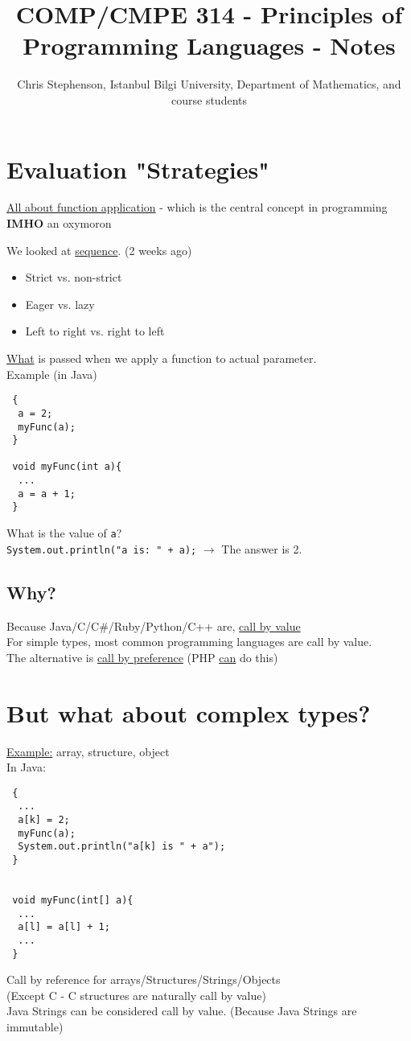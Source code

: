 \documentclass{article}
\begin{document}
\title{COMP/CMPE 314 - Principles of Programming Languages - Notes}
\author{Chris Stephenson, Istanbul Bilgi University, Department of Mathematics, and course students}
\maketitle

\section*{Evaluation "Strategies"}
\underline{All about function application} - which is the central concept in programming \textbf{IMHO} an oxymoron
\begin{flushleft}
 We looked at \underline{sequence}. (2 weeks ago)
 \begin{itemize}
  \item Strict vs. non-strict
  \item Eager vs. lazy
  \item Left to right vs. right to left
 \end{itemize}
\underline{What} is passed when we apply a function to actual parameter.\\
Example (in Java)\\
\begin{verbatim}
 {
  a = 2;
  myFunc(a);
 }
 
 void myFunc(int a){
  ...
  a = a + 1;
 }
\end{verbatim}
What is the value of \verb|a|?\\
\verb|System.out.println("a is: " + a);| $\rightarrow$ The answer is 2.
\end{flushleft}
\subsection*{Why?}
\begin{flushleft}
 Because Java/C/C\#/Ruby/Python/C++ are, \underline{call by value}\\
 For simple types, most common programming languages are call by value.\\
 The alternative is \underline{call by preference} (PHP \underline{can} do this)
\end{flushleft}
\section*{But what about complex types?}
\underline{Example:} array, structure, object\\
In Java:
\begin{verbatim}
 {
  ...
  a[k] = 2;
  myFunc(a);
  System.out.println("a[k] is " + a");
 }
 
 
 void myFunc(int[] a){
  ...
  a[l] = a[l] + 1;
  ...
 }
\end{verbatim}
\begin{flushleft}
Call by reference for arrays/Structures/Strings/Objects\\
(Except C - C structures are naturally call by value)\\
Java Strings can be considered call by value. (Because Java Strings are immutable)
\end{flushleft}
\end{document}
